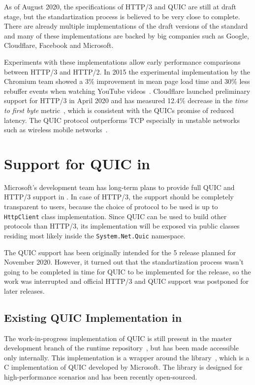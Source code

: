 As of August 2020, the specifications of HTTP/3 and QUIC are still at draft stage, but the
standartization process is believed to be very close to complete. There are already multiple
implementations of the draft versions of the standard and many of these implementations are backed
by big companies such as Google, Cloudflare, Facebook and Microsoft.

Experiments with these implementations allow early performance comparisons between HTTP/3 and
HTTP/2. In 2015 the experimental implementation by the Chromium team showed a 3\% improvement in
mean page load time and 30\% less rebuffer events when watching YouTube videos~\cite{Wilk2015}.
Cloudflare launched preliminary support for HTTP/3 in April 2020 and has measured 12.4\% decrease in
the \textit{time to first byte} metric~\cite{Tellakula2020}, which is consistent with the QUICs
promise of reduced latency. The QUIC protocol outperforms TCP especially in unstable networks such
as wireless mobile networks~\cite{Cook2017}.

\section{Support for QUIC in \dotnet{}}

Microsoft's \dotnet{} development team has long-term plans to provide full QUIC and HTTP/3 support
in \dotnet{}. In case of HTTP/3, the support should be completely transparent to users, because the
choice of protocol to be used is up to \texttt{HttpClient} class implementation.
Since QUIC can be used to build other protocols than HTTP/3, its implementation will be exposed via
public classes residing most likely inside the \texttt{System.Net.Quic} namespace.

The QUIC support has been originally intended for the \dotnet{} 5 release planned for November 2020.
However, it turned out that the standartization process wasn't going to be completed in time for
QUIC to be implemented for the release, so the work was interrupted and official HTTP/3 and QUIC
support was postponed for later releases.


\subsection*{Existing QUIC Implementation in \dotnet{}}

The work-in-progress implementation of QUIC is still present in the master development branch of the
\dotnet{} runtime repository~\cite{dotnetGithub}, but has been made accessible only internally. This
implementation is a wrapper around the \libmsquic{} library~\cite{msquicGithub}, which is a C
implementation of QUIC developed by Microsoft. The \libmsquic{} library is designed for
high-performance scenarios and has been recently open-sourced.

